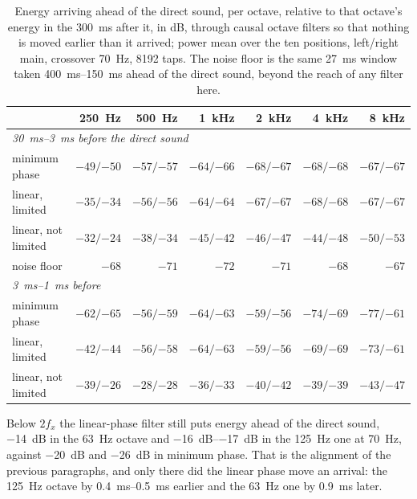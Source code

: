 \documentclass[10pt,a4paper]{article}
\begin{document}
\begin{table}[ht]
  \centering
  \small
  \begin{tabular}{lrrrrrr}
    \toprule
    & \SI{250}{\hertz} & \SI{500}{\hertz} & \SI{1}{\kilo\hertz} & \SI{2}{\kilo\hertz} & \SI{4}{\kilo\hertz} & \SI{8}{\kilo\hertz}\\
    \midrule
    \multicolumn{7}{l}{\textit{\SIrange{30}{3}{\milli\second} before the direct sound}}\\
    minimum phase       & $-49/{-50}$ & $-57/{-57}$ & $-64/{-66}$ & $-68/{-67}$ & $-68/{-68}$ & $-67/{-67}$\\
    linear, limited     & $-35/{-34}$ & $-56/{-56}$ & $-64/{-64}$ & $-67/{-67}$ & $-68/{-68}$ & $-67/{-67}$\\
    linear, not limited & $-32/{-24}$ & $-38/{-34}$ & $-45/{-42}$ & $-46/{-47}$ & $-44/{-48}$ & $-50/{-53}$\\
    noise floor         & $-68$     & $-71$     & $-72$     & $-71$     & $-68$     & $-67$\\
    \midrule
    \multicolumn{7}{l}{\textit{\SIrange{3}{1}{\milli\second} before}}\\
    minimum phase       & $-62/{-65}$ & $-56/{-59}$ & $-64/{-63}$ & $-59/{-56}$ & $-74/{-69}$ & $-77/{-61}$\\
    linear, limited     & $-42/{-44}$ & $-56/{-58}$ & $-64/{-63}$ & $-59/{-56}$ & $-69/{-69}$ & $-73/{-61}$\\
    linear, not limited & $-39/{-26}$ & $-28/{-28}$ & $-36/{-33}$ & $-40/{-42}$ & $-39/{-39}$ & $-43/{-47}$\\
    \bottomrule
  \end{tabular}
  \caption{Energy arriving ahead of the direct sound, per octave, relative to
  that octave's energy in the \SI{300}{\milli\second} after it, in dB, through
  causal octave filters so that nothing is moved earlier than it arrived; power
  mean over the ten positions, left/right main, crossover \SI{70}{\hertz},
  8192 taps. The noise floor is the same \SI{27}{\milli\second} window taken
  \SIrange{400}{150}{\milli\second} ahead of the direct sound, beyond the reach
  of any filter here.}
  \label{tab:preecho}
\end{table}

Below $2f_x$ the linear-phase filter still puts energy ahead of the direct sound, \SI{-14}{\dB} in the \SI{63}{\hertz} octave and \SIrange{-16}{-17}{\dB} in the \SI{125}{\hertz} one at \SI{70}{\hertz}, against \SI{-20}{\dB} and \SI{-26}{\dB} in minimum phase. That is the alignment of the previous paragraphs, and only there did the linear phase move an arrival: the \SI{125}{\hertz} octave by \SIrange{0.4}{0.5}{\milli\second} earlier and the \SI{63}{\hertz} one by \SI{0.9}{\milli\second} later.
\end{document}
